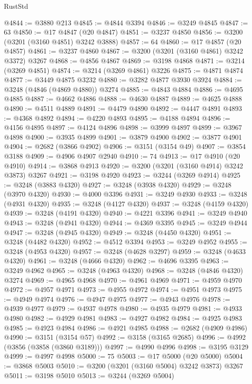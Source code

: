 \begin{lexlean}{RustStd}
\begin{coremodule}
@4844 := @3880 @213
@4845 := @4844 @3394
@4846 := @3249 @4845
@4847 := 63
@4850 := @17 @4847 (@20 @4847)
@4851 := @3237 @4850
@4856 := @3200 (@3201 (@3160 @4851) @3242 @3888)
@4857 := 64
@4860 := @17 @4857 (@20 @4857)
@4861 := @3237 @4860
@4867 := @3200 (@3201 (@3160 @4861) @3242 @3372) @3267
@4868 := @4856 @4867
@4869 := @3198 @4868
@4871 := @3214 (@3269 @4851)
@4874 := @3214 (@3269 @4861) @3226
@4875 := @4871 @4874
@4877 := @3449 @4875 @3232
@4880 := @3282 @4877 @3930 @3924
@4884 := @3248 (@4846 (@4869 @4880)) @3274
@4885 := @4843 @4884
@4886 := @4695 @4885
@4887 := @4662 @4886
@4888 := @4630 @4887
@4889 := @4625 @4888
@4890 := @4511 @4889
@4891 := @4479 @4890
@4892 := @4447 @4891
@4893 := @4368 @4892
@4894 := @4220 @4893
@4895 := @4188 @4894
@4896 := @4156 @4895
@4897 := @4124 @4896
@4898 := @3999 @4897
@4899 := @3967 @4898
@4900 := @3935 @4899
@4901 := @3879 @4900
@4902 := @3877 @4901
@4904 := @2682 (@3866 @4902)
@4906 := @3151 (@3154 @49)
@4907 := @3854 @3188
@4909 := @4906 @4907 @2940
@4910 := 74
@4913 := @17 @4910 (@20 @4910)
@4914 := @3868 @4913
@4920 := @3200 (@3201 (@3160 @4914) @3242 @3873) @3267
@4921 := @3198 @4920
@4923 := @3244 (@3269 @4914)
@4925 := @3248 (@3883 @4320)
@4927 := @3248 (@3938 @4320)
@4929 := @3248 (@3970 @4320)
@4930 := @4000 @3396
@4931 := @3249 @4930
@4933 := @3248 (@4931 @4320)
@4935 := @3248 (@4127 @4320)
@4937 := @3248 (@4159 @4320)
@4939 := @3248 (@4191 @4320)
@4940 := @4221 @3396
@4941 := @3249 @4940
@4943 := @3248 (@4941 @4320)
@4944 := @4369 @3395
@4945 := @3249 @4944
@4947 := @3248 (@4945 @4320)
@4949 := @3248 (@4450 @4320)
@4951 := @3248 (@4482 @4320)
@4952 := @4512 @3394
@4953 := @3249 @4952
@4955 := @3248 (@4953 @4320)
@4957 := @3248 (@4628 @3297)
@4959 := @3248 (@4633 @4320)
@4961 := @3248 (@4666 @4320)
@4962 := @4696 @3395
@4963 := @3249 @4962
@4965 := @3248 (@4963 @4320)
@4968 := @3248 (@4846 @4320) @3274
@4969 := @4965 @4968
@4970 := @4961 @4969
@4971 := @4959 @4970
@4972 := @4957 @4971
@4973 := @4955 @4972
@4974 := @4951 @4973
@4975 := @4949 @4974
@4976 := @4947 @4975
@4977 := @4943 @4976
@4978 := @4939 @4977
@4979 := @4937 @4978
@4980 := @4935 @4979
@4981 := @4933 @4980
@4982 := @4929 @4981
@4983 := @4927 @4982
@4984 := @4925 @4983
@4985 := @4923 @4984
@4986 := @4921 @4985
@4988 := @2682 (@4909 @4986)
@4990 := @3151 (@3154 @57)
@4992 := @3158 (@3165 @2685)
@4996 := @4992 (@3856 (@3858 (@3860 @3189)))
@4997 := @4990 @4996
@4998 := @3195 @3129
@4999 := @4997 @4998
@5000 := 75
@5003 := @17 @5000 (@20 @5000)
@5004 := @3868 @5003
@5010 := @3200 (@3201 (@3160 @5004) @3242 @3873) @3267
@5011 := @3198 @5010
@5013 := @3244 (@3269 @5004)

\end{coremodule}
\end{lexlean}
